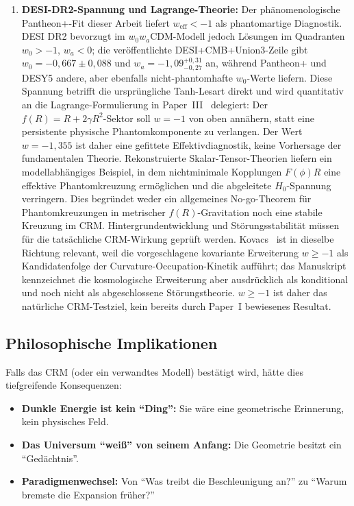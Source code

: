 \documentclass[aps,prd,twocolumn,superscriptaddress,nofootinbib]{revtex4-2}
\begin{document}
\begin{enumerate}
\item \textbf{DESI-DR2-Spannung und Lagrange-Theorie:} Der phänomenologische Pantheon+-Fit dieser Arbeit liefert $w_{\mathrm{eff}}< -1$ als phantomartige Diagnostik. DESI DR2 \cite{DESI2025} bevorzugt im $w_0w_a$CDM-Modell jedoch Lösungen im Quadranten $w_0>-1$, $w_a<0$; die veröffentlichte DESI+CMB+Union3-Zeile gibt $w_0=-0{,}667\pm0{,}088$ und $w_a=-1{,}09^{+0{,}31}_{-0{,}27}$ an, während Pantheon+ und DESY5 andere, aber ebenfalls nicht-phantomhafte $w_0$-Werte liefern. Diese Spannung betrifft die ursprüngliche Tanh-Lesart direkt und wird quantitativ an die Lagrange-Formulierung in Paper~III~\cite{Geiger2026c} delegiert: Der $f(R)=R+2\gamma R^2$-Sektor soll $w=-1$ von oben annähern, statt eine persistente physische Phantomkomponente zu verlangen. Der Wert $w=-1{,}355$ ist daher eine gefittete Effektivdiagnostik, keine Vorhersage der fundamentalen Theorie. Rekonstruierte Skalar-Tensor-Theorien \cite{Efstratiou2026} liefern ein modellabhängiges Beispiel, in dem nichtminimale Kopplungen $F(\phi)R$ eine effektive Phantomkreuzung ermöglichen und die abgeleitete $H_0$-Spannung verringern. Dies begründet weder ein allgemeines No-go-Theorem für Phantomkreuzungen in metrischer $f(R)$-Gravitation noch eine stabile Kreuzung im CRM. Hintergrundentwicklung und Störungsstabilität müssen für die tatsächliche CRM-Wirkung geprüft werden. Kovacs~\cite{Kovacs2026} ist in dieselbe Richtung relevant, weil die vorgeschlagene kovariante Erweiterung $w\geq -1$ als Kandidatenfolge der Curvature-Occupation-Kinetik aufführt; das Manuskript kennzeichnet die kosmologische Erweiterung aber ausdrücklich als konditional und noch nicht als abgeschlossene Störungstheorie. $w\geq -1$ ist daher das natürliche CRM-Testziel, kein bereits durch Paper~I bewiesenes Resultat.
\end{enumerate}

\subsection{Philosophische Implikationen}

Falls das CRM (oder ein verwandtes Modell) bestätigt wird, hätte dies tiefgreifende Konsequenzen:

\begin{itemize}
\item \textbf{Dunkle Energie ist kein ``Ding'':} Sie wäre eine geometrische Erinnerung, kein physisches Feld.
\item \textbf{Das Universum ``weiß'' von seinem Anfang:} Die Geometrie besitzt ein ``Gedächtnis''.
\item \textbf{Paradigmenwechsel:} Von ``Was treibt die Beschleunigung an?'' zu ``Warum bremste die Expansion früher?''
\end{itemize}
\end{document}
